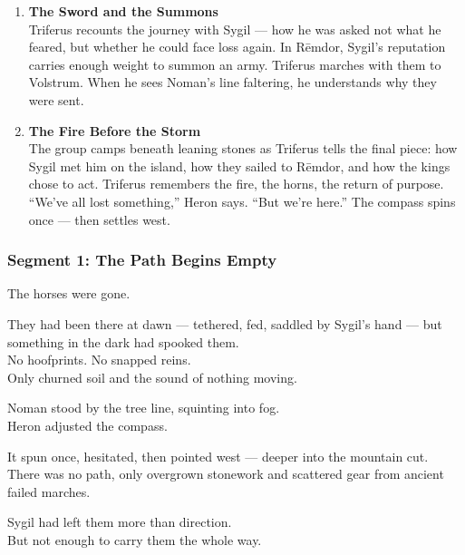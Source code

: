 \documentclass[9pt]{article}
\begin{document}
\begin{center}
\begin{enumerate}
\vspace{.3in}
\item \textbf{The Sword and the Summons} \\
Triferus recounts the journey with Sygil — how he was asked not what he feared, but whether he could face loss again. In Rēmdor, Sygil’s reputation carries enough weight to summon an army. Triferus marches with them to Volstrum. When he sees Noman’s line faltering, he understands why they were sent.

\vspace{.3in}
\item \textbf{The Fire Before the Storm} \\
The group camps beneath leaning stones as Triferus tells the final piece: how Sygil met him on the island, how they sailed to Rēmdor, and how the kings chose to act. Triferus remembers the fire, the horns, the return of purpose. “We’ve all lost something,” Heron says. “But we’re here.” The compass spins once — then settles west.
\end{enumerate}
\end{center}


\newpage

\subsubsection*{Segment 1: The Path Begins Empty}

The horses were gone.

They had been there at dawn — tethered, fed, saddled by Sygil’s hand — but something in the dark had spooked them.\\
No hoofprints. No snapped reins.\\
Only churned soil and the sound of nothing moving.

\vspace{1em}

Noman stood by the tree line, squinting into fog.\\
Heron adjusted the compass.

It spun once, hesitated, then pointed west — deeper into the mountain cut.\\
There was no path, only overgrown stonework and scattered gear from ancient failed marches.

Sygil had left them more than direction.\\
But not enough to carry them the whole way.

\vspace{1em}
\end{document}
